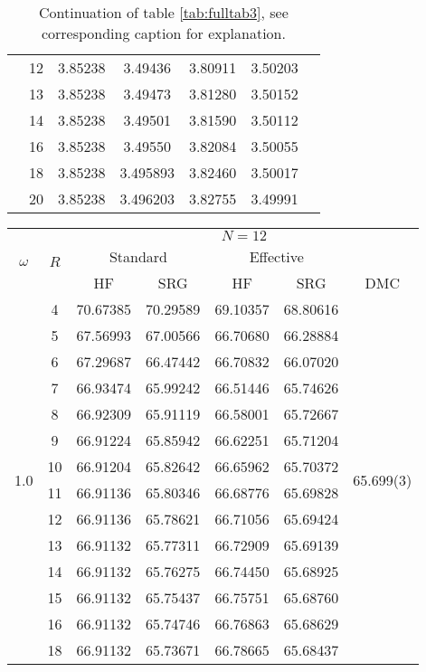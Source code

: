 \begin{table}
\begin{center}
\begin{tabular}{|c|c|c|c|c|c|c|}
& 12&3.85238 &3.49436 &3.80911 &3.50203 & \\
& 13& 3.85238 &3.49473 &3.81280 &3.50152 & \\
&14 &3.85238 & 3.49501 &3.81590 &3.50112 & \\
&16 &3.85238 &3.49550 &3.82084 &3.50055 & \\
& 18&3.85238  &3.495893 &3.82460 &3.50017 & \\
& 20 &3.85238 &3.496203 &3.82755 &3.49991 & \\
\hline
\end{tabular}
\end{center}
\caption{Continuation of table \ref{tab:fulltab3}, see corresponding caption for explanation.}
\label{tab:fulltab4}
\end{table}


\begin{table}
\begin{center}
\tabcolsep=0.35cm
\begin{tabular}{|c|c|c|c|c|c|c|}
\hline
\multirow{3}{*}{$\omega$} & \multirow{3}{*}{$R$} & \multicolumn{5}{|c|}{$N=12$} \\
& & \multicolumn{2}{|c|}{Standard} & \multicolumn{2}{|c|}{Effective} &  \\
& & HF & SRG & HF & SRG & DMC \\
\hline\hline
\multirow{15}{*}{1.0} & 4&70.67385 &70.29589 &69.10357 &68.80616 & \multirow{15}{*}{65.699(3)} \\ %
& 5&67.56993 &67.00566 &66.70680 &66.28884 & \\
& 6&67.29687 &66.47442 &66.70832 &66.07020 & \\
& 7&66.93474 &65.99242 &66.51446 & 65.74626 & \\
& 8&66.92309 &65.91119 &66.58001 &65.72667 & \\
& 9&66.91224 &65.85942 &66.62251 &65.71204 & \\
& 10&66.91204 &65.82642 &66.65962 &65.70372 & \\
& 11&66.91136 &65.80346 &66.68776 &65.69828 & \\
& 12&66.91136 &65.78621 &66.71056 &65.69424 & \\
& 13&66.91132 &65.77311 &66.72909 &65.69139 & \\
& 14 &66.91132 &65.76275 &66.74450 &65.68925 &\\
& 15 &66.91132 &65.75437 &66.75751 &65.68760 &  \\
& 16 &66.91132 & 65.74746 &66.76863 &65.68629 &  \\
& 18&66.91132 &65.73671 &66.78665 &  65.68437 & \\

\end{tabular}
\end{center}
\end{table}
